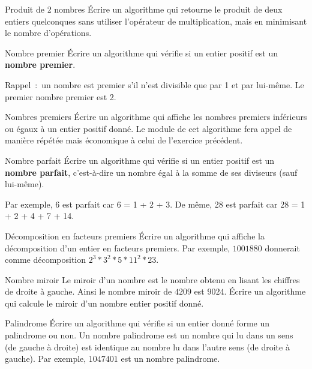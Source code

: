 	\begin{Exercice}{Produit de 2 nombres}
		Écrire un algorithme qui retourne le produit de deux entiers quelconques
		sans utiliser l’opérateur de multiplication, mais en minimisant le
		nombre d’opérations.
	\end{Exercice}
	
	\begin{Exercice}{Nombre premier}
		Écrire un algorithme qui vérifie si un entier positif est un
		\textbf{nombre premier}. 
		
		Rappel~:~un nombre est premier s’il n’est divisible que par 1 et par
		lui-même. Le premier nombre premier est 2.
	\end{Exercice}
	
	\begin{Exercice}{Nombres premiers}
		Écrire un algorithme qui affiche les nombres premiers inférieurs ou
		égaux à un entier positif donné. Le module de cet algorithme fera appel
		de manière répétée mais économique à celui de l’exercice précédent.
	\end{Exercice}
	
	\begin{Exercice}{Nombre parfait}
		Écrire un algorithme qui vérifie si un entier positif est un
		\textbf{nombre parfait}, c’est-à-dire un nombre égal à la somme de ses
		diviseurs (sauf lui-même). 
		
		Par exemple, 6 est parfait car 6 = 1 + 2 + 3. 
		De même, 28 est parfait car 28 = 1 + 2 + 4 + 7 + 14.
	\end{Exercice}
	
	\begin{Exercice}{Décomposition en facteurs premiers}
		Écrire un algorithme qui affiche la décomposition 
		d’un entier en facteurs premiers. 
		Par exemple, $1001880$ donnerait comme décomposition
		$2^3 * 3^2 * 5 * 11^2 * 23$.
	\end{Exercice}

	\begin{Exercice}{Nombre miroir}
		Le miroir d'un nombre est le nombre obtenu
		en lisant les chiffres de droite à gauche.
		Ainsi le nombre miroir de $4209$ est $9024$.
		Écrire un algorithme qui calcule le miroir
		d'un nombre entier positif donné.
	\end{Exercice}
	
	\begin{Exercice}{Palindrome}
		Écrire un algorithme qui vérifie si un entier donné 
		forme un palindrome ou non. 
		Un nombre palindrome est un nombre qui lu dans un sens 
		(de gauche à droite) est identique au nombre lu dans l’autre sens 
		(de droite à gauche). 
		Par exemple, $1047401$ est un nombre palindrome.
	\end{Exercice}
	
